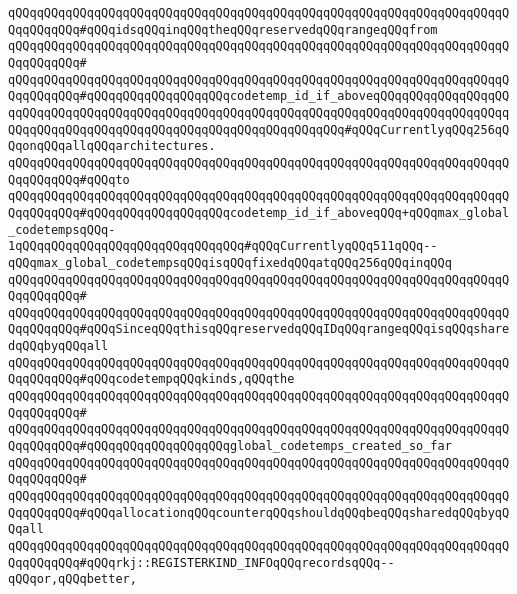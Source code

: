 \verb|qQQqqQQqqQQqqQQqqQQqqQQqqQQqqQQqqQQqqQQqqQQqqQQqqQQqqQQqqQQqqQQqqQQqqQQqqQQqqQQq#qQQqidsqQQqinqQQqtheqQQqreservedqQQqrangeqQQqfrom|\newline
\verb|qQQqqQQqqQQqqQQqqQQqqQQqqQQqqQQqqQQqqQQqqQQqqQQqqQQqqQQqqQQqqQQqqQQqqQQqqQQqqQQq#|\newline
\verb|qQQqqQQqqQQqqQQqqQQqqQQqqQQqqQQqqQQqqQQqqQQqqQQqqQQqqQQqqQQqqQQqqQQqqQQqqQQqqQQq#qQQqqQQqqQQqqQQqqQQqcodetemp_id_if_aboveqQQqqQQqqQQqqQQqqQQqqQQqqQQqqQQqqQQqqQQqqQQqqQQqqQQqqQQqqQQqqQQqqQQqqQQqqQQqqQQqqQQqqQQqqQQqqQQqqQQqqQQqqQQqqQQqqQQqqQQqqQQqqQQqqQQqqQQq#qQQqCurrentlyqQQq256qQQqonqQQqallqQQqarchitectures.|\newline
\verb|qQQqqQQqqQQqqQQqqQQqqQQqqQQqqQQqqQQqqQQqqQQqqQQqqQQqqQQqqQQqqQQqqQQqqQQqqQQqqQQq#qQQqto|\newline
\verb|qQQqqQQqqQQqqQQqqQQqqQQqqQQqqQQqqQQqqQQqqQQqqQQqqQQqqQQqqQQqqQQqqQQqqQQqqQQqqQQq#qQQqqQQqqQQqqQQqqQQqcodetemp_id_if_aboveqQQq+qQQqmax_global_codetempsqQQq-1qQQqqQQqqQQqqQQqqQQqqQQqqQQqqQQq#qQQqCurrentlyqQQq511qQQq--qQQqmax_global_codetempsqQQqisqQQqfixedqQQqatqQQq256qQQqinqQQq|\newline
\verb|qQQqqQQqqQQqqQQqqQQqqQQqqQQqqQQqqQQqqQQqqQQqqQQqqQQqqQQqqQQqqQQqqQQqqQQqqQQqqQQq#|\newline
\verb|qQQqqQQqqQQqqQQqqQQqqQQqqQQqqQQqqQQqqQQqqQQqqQQqqQQqqQQqqQQqqQQqqQQqqQQqqQQqqQQq#qQQqSinceqQQqthisqQQqreservedqQQqIDqQQqrangeqQQqisqQQqsharedqQQqbyqQQqall|\newline
\verb|qQQqqQQqqQQqqQQqqQQqqQQqqQQqqQQqqQQqqQQqqQQqqQQqqQQqqQQqqQQqqQQqqQQqqQQqqQQqqQQq#qQQqcodetempqQQqkinds,qQQqthe|\newline
\verb|qQQqqQQqqQQqqQQqqQQqqQQqqQQqqQQqqQQqqQQqqQQqqQQqqQQqqQQqqQQqqQQqqQQqqQQqqQQqqQQq#|\newline
\verb|qQQqqQQqqQQqqQQqqQQqqQQqqQQqqQQqqQQqqQQqqQQqqQQqqQQqqQQqqQQqqQQqqQQqqQQqqQQqqQQq#qQQqqQQqqQQqqQQqqQQqglobal_codetemps_created_so_far|\newline
\verb|qQQqqQQqqQQqqQQqqQQqqQQqqQQqqQQqqQQqqQQqqQQqqQQqqQQqqQQqqQQqqQQqqQQqqQQqqQQqqQQq#|\newline
\verb|qQQqqQQqqQQqqQQqqQQqqQQqqQQqqQQqqQQqqQQqqQQqqQQqqQQqqQQqqQQqqQQqqQQqqQQqqQQqqQQq#qQQqallocationqQQqcounterqQQqshouldqQQqbeqQQqsharedqQQqbyqQQqall|\newline
\verb|qQQqqQQqqQQqqQQqqQQqqQQqqQQqqQQqqQQqqQQqqQQqqQQqqQQqqQQqqQQqqQQqqQQqqQQqqQQqqQQq#qQQqrkj::REGISTERKIND_INFOqQQqrecordsqQQq--qQQqor,qQQqbetter,|\newline
